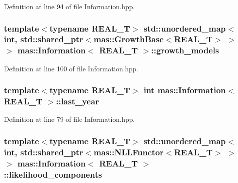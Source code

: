 Definition at line 94 of file Information.\-hpp.

\hypertarget{classmas_1_1_information_a0088dd940274db906032cd1d91abdedc}{
\subsubsection[{growth\-\_\-models}]{\setlength{\rightskip}{0pt plus 5cm}template$<$typename R\-E\-A\-L\-\_\-\-T$>$ std\-::unordered\-\_\-map$<$int, std\-::shared\-\_\-ptr$<${\bf mas\-::\-Growth\-Base}$<$R\-E\-A\-L\-\_\-\-T$>$ $>$ $>$ {\bf mas\-::\-Information}$<$ R\-E\-A\-L\-\_\-\-T $>$\-::growth\-\_\-models}}\label{classmas_1_1_information_a0088dd940274db906032cd1d91abdedc}


Definition at line 100 of file Information.\-hpp.

\hypertarget{classmas_1_1_information_ae988a6b80c30334b911f952df97201cc}{
\subsubsection[{last\-\_\-year}]{\setlength{\rightskip}{0pt plus 5cm}template$<$typename R\-E\-A\-L\-\_\-\-T$>$ int {\bf mas\-::\-Information}$<$ R\-E\-A\-L\-\_\-\-T $>$\-::last\-\_\-year}}\label{classmas_1_1_information_ae988a6b80c30334b911f952df97201cc}


Definition at line 79 of file Information.\-hpp.

\hypertarget{classmas_1_1_information_aa58693a25eea57a0080bb4b99515fc23}{
\subsubsection[{likelihood\-\_\-components}]{\setlength{\rightskip}{0pt plus 5cm}template$<$typename R\-E\-A\-L\-\_\-\-T$>$ std\-::unordered\-\_\-map$<$int, std\-::shared\-\_\-ptr$<${\bf mas\-::\-N\-L\-L\-Functor}$<$R\-E\-A\-L\-\_\-\-T$>$ $>$ $>$ {\bf mas\-::\-Information}$<$ R\-E\-A\-L\-\_\-\-T $>$\-::likelihood\-\_\-components}}\label{classmas_1_1_information_aa58693a25eea57a0080bb4b99515fc23}


